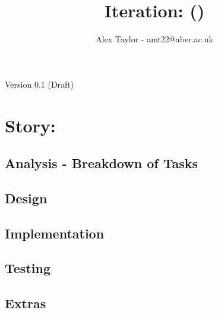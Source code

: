 \documentclass{article}
\title{Iteration: ()}
\author{Alex Taylor - amt22@aber.ac.uk}
\begin{document}
\maketitle
\begin{center}
	Version 0.1 (Draft)
\end{center}
\thispagestyle{empty}
\newpage

\section{Story: }
\subsection{Analysis - Breakdown of Tasks}
\subsection{Design}
\subsection{Implementation}
\subsection{Testing}
\subsection{Extras}
\newpage

%
%
\end{document}
